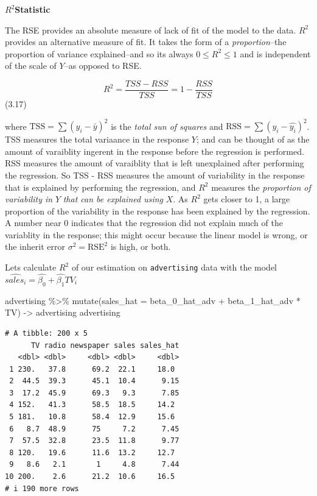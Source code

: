 \documentclass[
  letterpaper,
  DIV=11,
  numbers=noendperiod]{scrreprt}
\newenvironment{Shaded}{\begin{snugshade}}{\end{snugshade}}
\newcommand{\AttributeTok}[1]{\textcolor[rgb]{0.65,0.35,0.00}{#1}}
\newcommand{\FunctionTok}[1]{\textcolor[rgb]{0.02,0.16,0.49}{#1}}
\newcommand{\NormalTok}[1]{\textcolor[rgb]{0.33,0.33,0.33}{#1}}
\newcommand{\OtherTok}[1]{\textcolor[rgb]{0.85,0.12,0.09}{#1}}
\newcommand{\SpecialCharTok}[1]{\textcolor[rgb]{0.00,0.46,0.62}{#1}}
\begin{document}
\(R^2\)\textbf{Statistic}

The RSE provides an absolute measure of lack of fit of the model to the
data. \(R^2\) provides an alternative measure of fit. It takes the form
of a \emph{proportion}--the proportion of variance explained--and so its
always \(0\leq R^2 \leq 1\) and is independent of the scale of \(Y\)--as
opposed to RSE.

\[
R^2 = \frac{TSS - RSS}{TSS} = 1 - \frac{RSS}{TSS}
\] (3.17)

where \(\text{TSS} = \sum(y_i - \bar{y})^2\) is the \emph{total sun of
squares} and \(\text{RSS} = \sum(y_i - \hat{y_i})^2\). TSS measures the
total variaance in the response \(Y\); and can be thought of as the
amount of varaiblity ingerent in the response before the regression is
performed. RSS measures the amount of varaiblity that is left
unexplained after performing the regression. So TSS - RSS measures the
amount of variability in the response that is explained by performing
the regression, and \(R^2\) measures the \emph{proportion of variability
in} \(Y\) \emph{that can be explained using} \(X\). As \(R^2\) gets
closer to 1, a large proportion of the variability in the response has
been explained by the regression. A number near 0 indicates that the
regression did not explain much of the variablity in the response; this
might occur because the linear model is wrong, or the inherit error
\(\sigma^2 = \text{RSE}^2\) is high, or both.

Lets calculate \(R^2\) of our estimation on \texttt{advertising} data
with the model \(\hat{sales_i} = \hat{\beta_0} + \hat{\beta_1}TV_i\)

\begin{Shaded}
\begin{Highlighting}[]
\NormalTok{advertising }\SpecialCharTok{\%\textgreater{}\%} 
  \FunctionTok{mutate}\NormalTok{(}\AttributeTok{sales\_hat =}\NormalTok{ beta\_0\_hat\_adv }\SpecialCharTok{+}\NormalTok{ beta\_1\_hat\_adv }\SpecialCharTok{*}\NormalTok{ TV) }\OtherTok{{-}\textgreater{}}\NormalTok{ advertising}
\NormalTok{advertising}
\end{Highlighting}
\end{Shaded}

\begin{verbatim}
# A tibble: 200 x 5
      TV radio newspaper sales sales_hat
   <dbl> <dbl>     <dbl> <dbl>     <dbl>
 1 230.   37.8      69.2  22.1     18.0 
 2  44.5  39.3      45.1  10.4      9.15
 3  17.2  45.9      69.3   9.3      7.85
 4 152.   41.3      58.5  18.5     14.2 
 5 181.   10.8      58.4  12.9     15.6 
 6   8.7  48.9      75     7.2      7.45
 7  57.5  32.8      23.5  11.8      9.77
 8 120.   19.6      11.6  13.2     12.7 
 9   8.6   2.1       1     4.8      7.44
10 200.    2.6      21.2  10.6     16.5 
# i 190 more rows
\end{verbatim}
\end{document}
